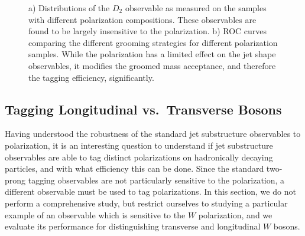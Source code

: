 \documentclass[11pt,letterpaper]{article}
\begin{document}
\begin{figure}
\begin{center}
\end{center}
\caption{a) Distributions of the $D_2$ observable as measured on the samples with different polarization compositions. These observables are found to be largely insensitive to the polarization. b) ROC curves comparing the different grooming strategies for different polarization samples. While the polarization has a limited effect on the jet shape observables, it modifies the groomed mass acceptance, and therefore the tagging efficiency, significantly.}
\end{figure}

\subsection{Tagging Longitudinal vs.\ Transverse Bosons}\label{sec:polar_tag}

Having understood the robustness of the standard jet substructure observables to polarization, it is an interesting question to understand if jet substructure observables are able to tag distinct polarizations on hadronically decaying particles, and with what efficiency this can be done.
%
Since the standard two-prong tagging observables are not particularly sensitive to the polarization, a different observable must be used to tag polarizations.
%
In this section, we do not perform a comprehensive study, but restrict ourselves to studying a particular example of an observable which is sensitive to the $W$ polarization, and we evaluate its performance for distinguishing transverse and longitudinal $W$ bosons. 
\end{document}
